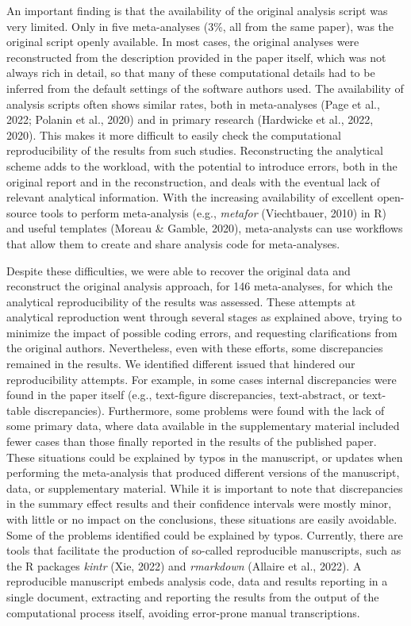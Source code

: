\documentclass[
  ,jou, a4paper,floatsintext]{apa6}
\begin{document}
An important finding is that the availability of the original analysis script was very limited. Only in five meta-analyses (3\%, all from the same paper), was the original script openly available. In most cases, the original analyses were reconstructed from the description provided in the paper itself, which was not always rich in detail, so that many of these computational details had to be inferred from the default settings of the software authors used. The availability of analysis scripts often shows similar rates, both in meta-analyses (Page et al., 2022; Polanin et al., 2020) and in primary research (Hardwicke et al., 2022, 2020). This makes it more difficult to easily check the computational reproducibility of the results from such studies. Reconstructing the analytical scheme adds to the workload, with the potential to introduce errors, both in the original report and in the reconstruction, and deals with the eventual lack of relevant analytical information. With the increasing availability of excellent open-source tools to perform meta-analysis (e.g., \emph{metafor} (Viechtbauer, 2010) in R) and useful templates (Moreau \& Gamble, 2020), meta-analysts can use workflows that allow them to create and share analysis code for meta-analyses.

Despite these difficulties, we were able to recover the original data and reconstruct the original analysis approach, for 146 meta-analyses, for which the analytical reproducibility of the results was assessed. These attempts at analytical reproduction went through several stages as explained above, trying to minimize the impact of possible coding errors, and requesting clarifications from the original authors. Nevertheless, even with these efforts, some discrepancies remained in the results. We identified different issued that hindered our reproducibility attempts. For example, in some cases internal discrepancies were found in the paper itself (e.g., text-figure discrepancies, text-abstract, or text-table discrepancies). Furthermore, some problems were found with the lack of some primary data, where data available in the supplementary material included fewer cases than those finally reported in the results of the published paper. These situations could be explained by typos in the manuscript, or updates when performing the meta-analysis that produced different versions of the manuscript, data, or supplementary material. While it is important to note that discrepancies in the summary effect results and their confidence intervals were mostly minor, with little or no impact on the conclusions, these situations are easily avoidable. Some of the problems identified could be explained by typos. Currently, there are tools that facilitate the production of so-called reproducible manuscripts, such as the R packages \emph{kintr} (Xie, 2022) and \emph{rmarkdown} (Allaire et al., 2022). A reproducible manuscript embeds analysis code, data and results reporting in a single document, extracting and reporting the results from the output of the computational process itself, avoiding error-prone manual transcriptions.
\end{document}
